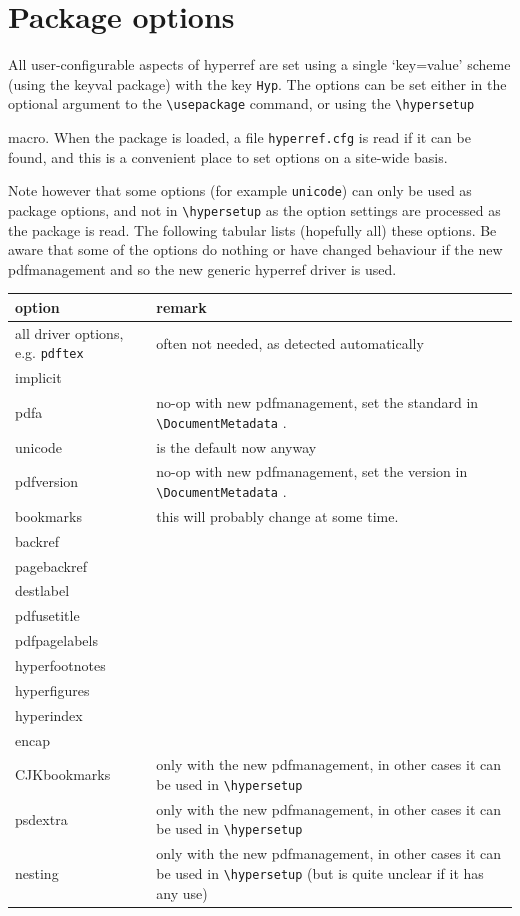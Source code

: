 \documentclass{article}
\newcommand*{\cs}[1]{%
  \texttt{\textbackslash #1}%
}
\newcommand*{\xpackage}[1]{\textsf{#1}}
\begin{document}
\section{Package options}

All user-configurable aspects of \xpackage{hyperref} are set using a
single `key=value' scheme (using the \xpackage{keyval} package) with the
key \texttt{Hyp}. The options can be set either in the optional argument
to the \cs{usepackage} command, or using the \cs{hypersetup}
macro. When the package is loaded, a file \texttt{hyperref.cfg} is read
if it can be found, and this is a convenient place to set options on a
site-wide basis.

Note however that some options (for example \texttt{unicode}) can only be used as
package options, and not in \verb|\hypersetup| as the option settings are processed
as the package is read. The following tabular lists (hopefully all) these options.
Be aware that some of the options do nothing or have
changed behaviour if the new pdfmanagement and so the new generic \xpackage{hyperref} driver is used.

\begin{tabular}{>{\ttfamily}l>{\raggedright\arraybackslash}p{5cm}}
option     & remark \\\hline
all driver options, e.g. \texttt{pdftex} & often not needed, as detected automatically\\
implicit   \\
pdfa       & no-op with new pdfmanagement, set the standard in \cs{DocumentMetadata}.\\
unicode    & is the default now anyway\\
pdfversion & no-op with new pdfmanagement, set the version in \cs{DocumentMetadata}.\\
bookmarks  & this will probably change at some time. \\
backref &\\
pagebackref & \\
destlabel  &\\
pdfusetitle &\\
pdfpagelabels &\\
hyperfootnotes &\\
hyperfigures&\\
hyperindex &\\
encap &\\
CJKbookmarks & only with the new pdfmanagement, in other cases it can be used in \cs{hypersetup}\\
psdextra     & only with the new pdfmanagement, in other cases it can be used in \cs{hypersetup}\\
nesting      & only with the new pdfmanagement, in other cases it can be used in \cs{hypersetup} (but
               is quite unclear if it has any use)\\

\end{tabular}
\end{document}
